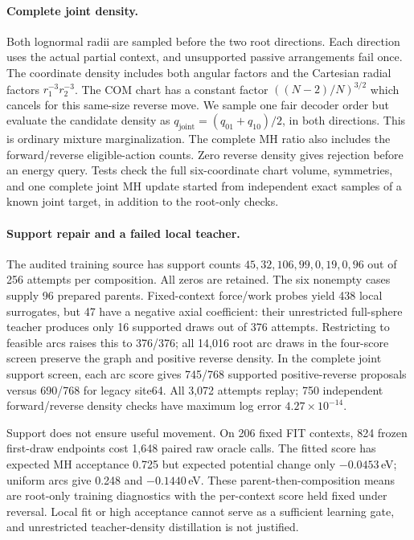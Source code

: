 \paragraph{Complete joint density.}
Both lognormal radii are sampled before the two root directions. Each direction
uses the actual partial context, and unsupported passive arrangements fail once.
The coordinate density includes both angular factors and the Cartesian radial
factors $r_1^{-3}r_2^{-3}$. The COM chart has a constant factor
$((N-2)/N)^{3/2}$ which cancels for this same-size reverse move. We sample one
fair decoder order but evaluate the candidate density as
$q_{\mathrm{joint}}=(q_{01}+q_{10})/2$, in both directions. This is ordinary
mixture marginalization. The complete MH ratio also includes the forward/reverse
eligible-action counts. Zero reverse density gives rejection before an energy
query. Tests check the full six-coordinate chart volume, symmetries, and one
complete joint MH update started from independent exact samples of a known
joint target, in addition to the root-only checks.

\paragraph{Support repair and a failed local teacher.}
The audited training source has support counts $45,32,106,99,0,19,0,96$ out of
256 attempts per composition. All zeros are retained. The six nonempty cases
supply 96 prepared parents. Fixed-context force/work probes yield 438 local
surrogates, but 47 have a negative axial coefficient: their unrestricted
full-sphere teacher produces only 16 supported draws out of 376 attempts.
Restricting to feasible arcs raises this to 376/376; all 14,016 root arc draws
in the four-score screen preserve the graph and positive reverse density.
In the complete joint support screen, each arc score gives 745/768 supported
positive-reverse proposals versus 690/768 for legacy site64. All 3,072 attempts
replay; 750 independent forward/reverse density checks have maximum log error
$4.27\times10^{-14}$.

Support does not ensure useful movement. On 206 fixed FIT contexts, 824 frozen
first-draw endpoints cost 1,648 paired raw oracle calls. The fitted score has
expected MH acceptance 0.725 but expected potential change only $-0.0453$\,eV;
uniform arcs give 0.248 and $-0.1440$\,eV. These parent-then-composition means are
root-only training diagnostics with the per-context score held fixed under
reversal. Local fit or high acceptance cannot serve as a sufficient learning
gate, and unrestricted teacher-density distillation is not justified.

